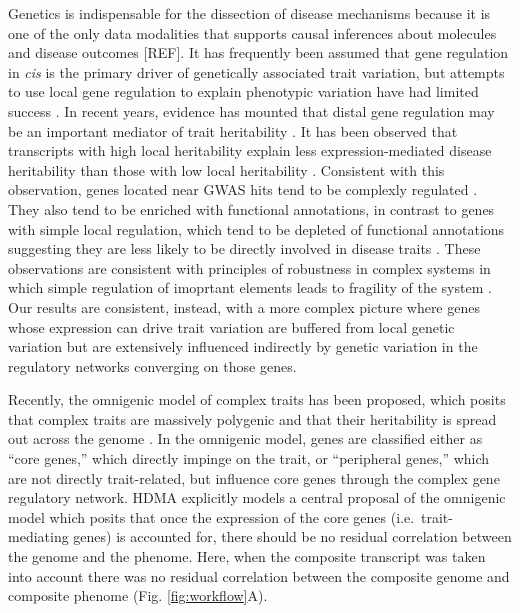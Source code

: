 \documentclass[
]{article}
\begin{document}
Genetics is indispensable for the dissection of disease mechanisms
because it is one of the only data modalities that supports causal
inferences about molecules and disease outcomes {[}REF{]}. It has
frequently been assumed that gene regulation in \textit{cis} is the
primary driver of genetically associated trait variation, but attempts
to use local gene regulation to explain phenotypic variation have had
limited success \cite{pmid32912663, pmid36515579}. In recent years,
evidence has mounted that distal gene regulation may be an important
mediator of trait heritability \cite{pmid32424349, 
pmid37857933, pmid31051098}. It has been observed that transcripts with
high local heritability explain less expression-mediated disease
heritability than those with low local heritability \cite{pmid32424349}.
Consistent with this observation, genes located near GWAS hits tend to
be complexly regulated \cite{pmid37857933}. They also tend to be
enriched with functional annotations, in contrast to genes with simple
local regulation, which tend to be depleted of functional annotations
suggesting they are less likely to be directly involved in disease
traits \cite{pmid37857933}. These observations are consistent with
principles of robustness in complex systems in which simple regulation
of imoprtant elements leads to fragility of the system
\cite{pmid29782925, pmid12082173, pmid27304973}. Our results are
consistent, instead, with a more complex picture where genes whose
expression can drive trait variation are buffered from local genetic
variation but are extensively influenced indirectly by genetic variation
in the regulatory networks converging on those genes.

Recently, the omnigenic model of complex traits has been proposed, which
posits that complex traits are massively polygenic and that their
heritability is spread out across the genome \cite{pmid28622505}. In the
omnigenic model, genes are classified either as ``core genes,'' which
directly impinge on the trait, or ``peripheral genes,'' which are not
directly trait-related, but influence core genes through the complex
gene regulatory network. HDMA explicitly models a central proposal of
the omnigenic model which posits that once the expression of the core
genes (i.e.~trait-mediating genes) is accounted for, there should be no
residual correlation between the genome and the phenome. Here, when the
composite transcript was taken into account there was no residual
correlation between the composite genome and composite phenome (Fig.
\ref{fig:workflow}A).
\end{document}
